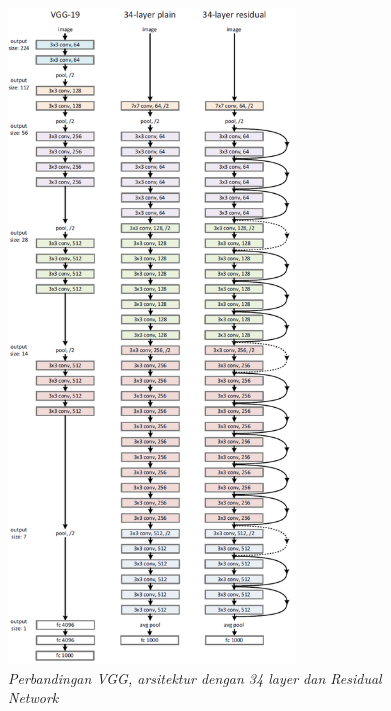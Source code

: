 \begin{figure}[H]
	\centering\includegraphics[width=0.68\textwidth]{bab2/figures/resnet.png}
	\caption{\textit{Perbandingan VGG, arsitektur dengan 34 layer dan Residual Network}\cite{resnet}}
	\label{fig:abstraksi1}
\end{figure}
